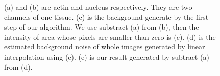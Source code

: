 \documentclass{article}
\begin{document}
\begin{figure}


	\caption{(a) and (b) are actin and nucleus respectively. They are two channels of one tissue. (c) is the background generate by the first step of our algorithm. We use substract (a) from (b), then the intensity of area whose pixels are smaller than zero is (c). (d) is the estimated background noise of whole images generated by linear interpolation using (c). (e) is our result generated by subtract (a) from (d).}
	\label{fig:actin_44}
\end{figure}
\end{document}
